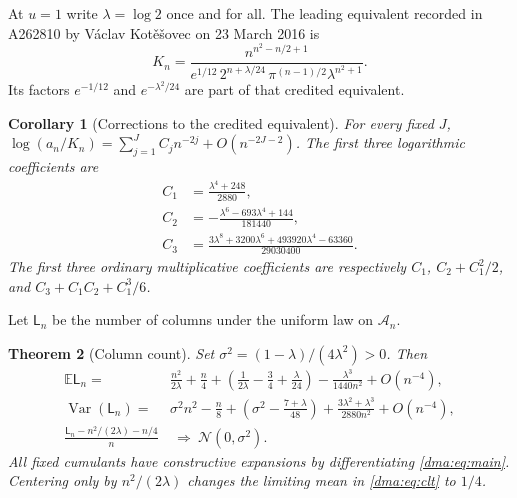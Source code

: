\documentclass[11pt,letterpaper]{article}
\newtheorem{theorem}{Theorem}[section]
\newtheorem{corollary}[theorem]{Corollary}
\theoremstyle{remark}\newtheorem{remark}[theorem]{Remark}
\newcommand{\E}{\mathbb E}
\newcommand{\Var}{\operatorname{Var}}
\newcommand{\Normal}{\mathcal N}
\begin{document}
At $u=1$ write $\lambda=\log 2$ once and for all. The leading equivalent recorded in A262810 by V\'aclav Kot\v{e}\v{s}ovec on 23 March 2016 is
\begin{equation}\label{dma:eq:K}
 K_n=\frac{n^{n^2-n/2+1}}
 {e^{1/12}\,2^{n+\lambda/24}\,\pi^{(n-1)/2}\lambda^{n^2+1}}.
\end{equation}
Its factors $e^{-1/12}$ and $e^{-\lambda^2/24}$ are part of that credited equivalent.
\begin{corollary}[Corrections to the credited equivalent]\label{dma:cor:C}
For every fixed $J$, $\log(a_n/K_n)=\sum_{j=1}^J C_jn^{-2j}+O(n^{-2J-2})$. The first three logarithmic coefficients are
\begin{align}
 C_1&=\frac{\lambda^4+248}{2880},\label{dma:eq:C1}\\
 C_2&=-\frac{\lambda^6-693\lambda^4+144}{181440},\label{dma:eq:C2}\\
 C_3&=\frac{3\lambda^8+3200\lambda^6+493920\lambda^4-63360}{29030400}.\label{dma:eq:C3}
\end{align}
The first three ordinary multiplicative coefficients are respectively
$C_1$, $C_2+C_1^2/2$, and $C_3+C_1C_2+C_1^3/6$.
\end{corollary}

Let $\mathsf L_n$ be the number of columns under the uniform law on $\mathcal A_n$.
\begin{theorem}[Column count]\label{dma:thm:law}
Set $\sigma^2=(1-\lambda)/(4\lambda^2)>0$. Then
\begin{align}
 \E\mathsf L_n={}&\frac{n^2}{2\lambda}+\frac n4+
 \left(\frac1{2\lambda}-\frac34+\frac\lambda{24}\right)
 -\frac{\lambda^3}{1440n^2}+O(n^{-4}),\label{dma:eq:mean}\\
 \Var(\mathsf L_n)={}&\sigma^2 n^2-\frac n8+
 \left(\sigma^2-\frac{7+\lambda}{48}\right)
 +\frac{3\lambda^2+\lambda^3}{2880n^2}+O(n^{-4}),\label{dma:eq:variance}\\
 \frac{\mathsf L_n-n^2/(2\lambda)-n/4}{n}
 &\ \Longrightarrow\ \Normal(0,\sigma^2).\label{dma:eq:clt}
\end{align}
All fixed cumulants have constructive expansions by differentiating \eqref{dma:eq:main}. Centering only by $n^2/(2\lambda)$ changes the limiting mean in \eqref{dma:eq:clt} to $1/4$.
\end{theorem}
\end{document}
